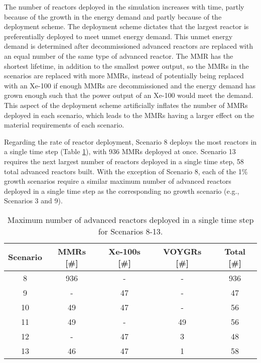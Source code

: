 The number 
of reactors deployed in the simulation increases with time, 
partly because of the growth in the energy demand and partly 
because of the deployment scheme. The deployment scheme 
dictates that the largest reactor is preferentially deployed to 
meet unmet energy demand. This unmet energy demand is determined 
after decommissioned advanced reactors are replaced with an 
equal number of the same type of advanced reactor. The \gls{MMR} 
has the shortest lifetime, in addition to the smallest power 
output, so the \glspl{MMR} in the scenarios are replaced with more 
\glspl{MMR}, instead of potentially being replaced with an Xe-100 
if enough \glspl{MMR} are decommissioned and the energy demand 
has grown enough such that the power output of an Xe-100 would 
meet the demand. This aspect of the deployment scheme artificially 
inflates the number of \glspl{MMR} deployed in each scenario, 
which leads to the \glspl{MMR} having a larger effect on the 
material requirements of each scenario. 

Regarding the rate of reactor deployment, Scenario 8 deploys the most 
reactors in a single time step (Table 
\ref{tab:reactors_added_1percent}), with 936 \glspl{MMR} deployed at once. 
Scenario 13 requires the next largest number of reactors deployed in 
a single time step, 58 total advanced reactors built.
With the exception of Scenario 8, each of 
the 1\% growth scenarios require a similar maximum number of advanced 
reactors deployed in a single time step as the corresponding no growth 
scenario (e.g., Scenarios 3 and 9). 

\begin{table}
    \centering 
    \caption{Maximum number of advanced reactors deployed in a single 
    time step for Scenarios 8-13.}
    \label{tab:reactors_added_1percent}
    \begin{tabular}{c c c c c}
        \hline
        Scenario & \glspl{MMR} [\#] & Xe-100s [\#] & VOYGRs [\#] 
        & Total [\#]\\\hline
        8 & 936 & - & - & 936\\
        9 & - & 47 & - & 47\\
        10 & 49 & 47 & - & 56\\
        11 & 49 & - & 49 & 56\\
        12 & - & 47 & 3 & 48\\
        13 & 46 & 47 & 1 & 58\\
        \hline
    \end{tabular}
\end{table}

